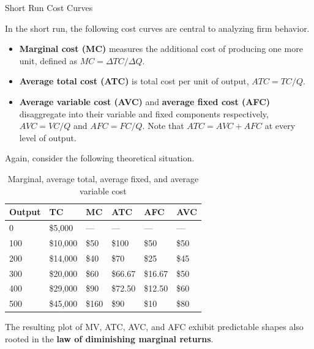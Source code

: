 \documentclass[10pt]{article}
\begin{document}
    \begin{core}{Short Run Cost Curves}

      In the short run, the following cost curves are central to analyzing firm behavior.

      \begin{itemize}

        \item \textbf{Marginal cost (MC)} measures the additional cost of producing one more unit, defined as $MC = \Delta TC / \Delta Q$.

        \item \textbf{Average total cost (ATC)} is total cost per unit of output, $ATC = TC/Q$.

        \item \textbf{Average variable cost (AVC)} and \textbf{average fixed cost (AFC)} disaggregate into their variable and fixed components respectively, $AVC = VC/Q$ and $AFC = FC/Q$. Note that $ATC = AVC + AFC$ at every level of output.

      \end{itemize}

      Again, consider the following theoretical situation.

      \begin{table}[H]
        \centering
        \begin{tabular}{llllll}
          \hline
          \hline
          \textbf{Output} & \textbf{TC} & \textbf{MC} & \textbf{ATC} & \textbf{AFC} & \textbf{AVC} \\
          \hline
          0   & \$5,000  & ---   & ---     & ---     & ---   \\
          100 & \$10,000 & \$50  & \$100   & \$50    & \$50  \\
          200 & \$14,000 & \$40  & \$70    & \$25    & \$45  \\
          300 & \$20,000 & \$60  & \$66.67 & \$16.67 & \$50  \\
          400 & \$29,000 & \$90  & \$72.50 & \$12.50 & \$60  \\
          500 & \$45,000 & \$160 & \$90    & \$10    & \$80  \\
          \hline
          \hline
        \end{tabular}
        \caption{Marginal, average total, average fixed, and average variable cost}
        \label{tab:matav}
      \end{table}

      The resulting plot of MV, ATC, AVC, and AFC exhibit predictable shapes also rooted in the \textbf{law of diminishing marginal returns}.


\end{core}
\end{document}
